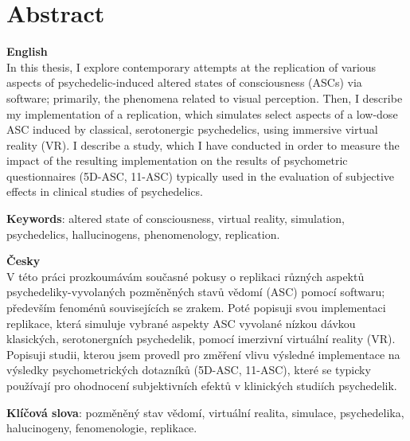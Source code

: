 \chapter*{Abstract}

{\Large\textbf{English}}\\
In this thesis, I explore contemporary attempts at the replication of various aspects of psychedelic-induced altered states of consciousness (ASCs) via software; primarily, the phenomena related to visual perception. Then, I describe my implementation of a replication, which simulates select aspects of a low-dose ASC induced by classical, serotonergic psychedelics, using immersive virtual reality (VR). I describe a study, which I have conducted in order to measure the impact of the resulting implementation on the results of psychometric questionnaires (5D-ASC, 11-ASC) typically used in the evaluation of subjective effects in clinical studies of psychedelics.

\textbf{Keywords}: altered state of consciousness, virtual reality, simulation, psychedelics, hallucinogens, phenomenology, replication.

\vspace{0.5cm}
\noindent
{\Large\textbf{Česky}}\\
V této práci prozkoumávám současné pokusy o replikaci různých aspektů psychedeliky-vyvolaných pozměněných stavů vědomí (ASC) pomocí softwaru; především fenoménů souvisejících se zrakem. Poté popisuji svou implementaci replikace, která simuluje vybrané aspekty ASC vyvolané nízkou dávkou klasických, serotonergních psychedelik, pomocí imerzivní virtuální reality (VR). Popisuji studii, kterou jsem provedl pro změření vlivu výsledné implementace na výsledky psychometrických dotazníků (5D-ASC, 11-ASC), které se typicky používají pro ohodnocení subjektivních efektů v klinických studiích psychedelik.

\textbf{Klíčová slova}: pozměněný stav vědomí, virtuální realita, simulace, psychedelika, halucinogeny, fenomenologie, replikace.
